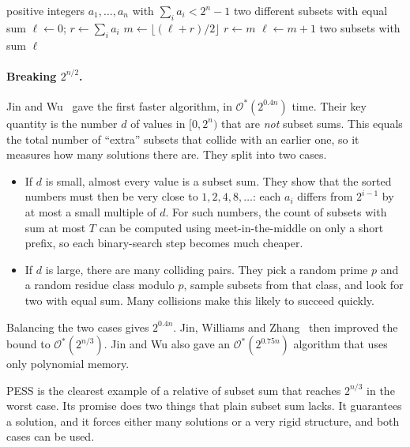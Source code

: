 \documentclass[11pt]{article}
\newcommand{\Oh}{\mathcal{O}}
\begin{document}
\begin{algorithm}[t]
\caption{Pigeonhole binary search for PESS}
\label{alg:pess}
\begin{algorithmic}[1]
\Require positive integers $a_1,\dots,a_n$ with $\sum_ia_i<2^n-1$
\Ensure two different subsets with equal sum
\State $\ell\gets0$; $r\gets\sum_ia_i$
  \State $m\gets\lfloor(\ell+r)/2\rfloor$
   
    \State $r\gets m$
  \Else
    \State $\ell\gets m+1$
  \EndIf
\EndWhile
\State \Return two subsets with sum $\ell$
\end{algorithmic}
\end{algorithm}

\paragraph{Breaking $2^{n/2}$.}
Jin and Wu~\cite{jw} gave the first faster algorithm, in $\Oh^*(2^{0.4n})$
time. Their key quantity is the number $d$ of values in $[0,2^n)$ that are
\emph{not} subset sums. This equals the total number of ``extra'' subsets that
collide with an earlier one, so it measures how many solutions there are. They
split into two cases.
\begin{itemize}
\item If $d$ is small, almost every value is a subset sum. They show that the
sorted numbers must then be very close to $1,2,4,8,\dots$: each $a_i$ differs
from $2^{i-1}$ by at most a small multiple of $d$. For such numbers, the count
of subsets with sum at most $T$ can be computed using meet-in-the-middle on only
a short prefix, so each binary-search step becomes much cheaper.
\item If $d$ is large, there are many colliding pairs. They pick a random
prime $p$ and a random residue class modulo $p$, sample subsets from that
class, and look for two with equal sum. Many collisions make this likely to
succeed quickly.
\end{itemize}
Balancing the two cases gives $2^{0.4n}$. Jin, Williams and Zhang~\cite{jwz}
then improved the bound to $\Oh^*(2^{n/3})$. Jin and Wu also gave an
$\Oh^*(2^{0.75n})$ algorithm that uses only polynomial memory.

PESS is the clearest example of a relative of subset sum that reaches
$2^{n/3}$ in the worst case. Its promise does two things that plain subset sum
lacks. It guarantees a solution, and it forces either many solutions or a very
rigid structure, and both cases can be used.
\end{document}

